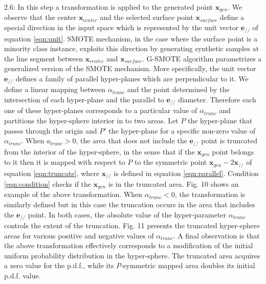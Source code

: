 \documentclass[parskip=full]{scrartcl}
\begin{document}
2.6: In this step a transformation is applied to the generated point \( \textbf{x}_{gen} \). We observe that the center \( \textbf{x}_{center} \) and the selected surface point \( \textbf{x}_{surface} \) define a special direction in the input space which is represented by the unit vector \( \textbf{e}_{\scriptscriptstyle//} \) of equation \eqref{eqn:unit}. SMOTE mechanism, in the case where the surface point is a minority class instance, exploits this direction by generating synthetic samples at the line segment between \( \textbf{x}_{center} \) and \( \textbf{x}_{surface} \). G-SMOTE algorithm parametrizes a generalized version of the SMOTE mechanism. More specifically, the unit vector \( \textbf{e}_{\scriptscriptstyle//} \) defines a family of parallel hyper-planes which are perpendicular to it. We define a linear mapping between \( \alpha_{trunc} \) and the point determined by the intersection of each hyper-plane and the parallel to \( \textbf{e}_{\scriptscriptstyle//} \) diameter. Therefore each one of these hyper-planes corresponds to a particular value of \( \alpha_{trunc} \) and partitions the hyper-sphere interior in to two areas. Let \( P \) the hyper-plane that passes through the origin and \( P' \) the hyper-plane for a specific non-zero value of \( \alpha_{trunc} \). When \( a_{trunc} > 0 \), the area that does not include the \( \textbf{e}_{\scriptscriptstyle//} \) point is truncated from the interior of the hyper-sphere, in the sense that if the \( \textbf{x}_{gen} \) point belongs to it then it is mapped with respect to \( P \) to the symmetric point \( \textbf{x}_{gen} - 2 \textbf{x}_{\scriptscriptstyle//} \) of equation  \eqref{eqn:truncate}, where \( \textbf{x}_{\scriptscriptstyle//} \) is defined in equation \eqref{eqn:parallel}. Condition  \eqref{eqn:condition} checks if  the \( \textbf{x}_{gen} \) is in the truncated area. Fig. 10 shows an example of the above transformation. When \( \alpha_{trunc} < 0 \), the transformation is similarly defined but in this case the truncation occurs in the area that includes the \( \textbf{e}_{\scriptscriptstyle//} \) point. In both cases, the absolute value of the hyper-parameter \( \alpha_{trunc} \) controls the extent of the truncation. Fig. 11 presents the truncated hyper-sphere areas for various positive and negative values of \( \alpha_{trunc} \). A final observation is that the above transformation effectively corresponds to a modification of the initial uniform probability distribution in the hyper-sphere. The truncated area acquires a zero value for the p.d.f., while its \( P \)-symmetric mapped area doubles its initial p.d.f. value.
\end{document}
